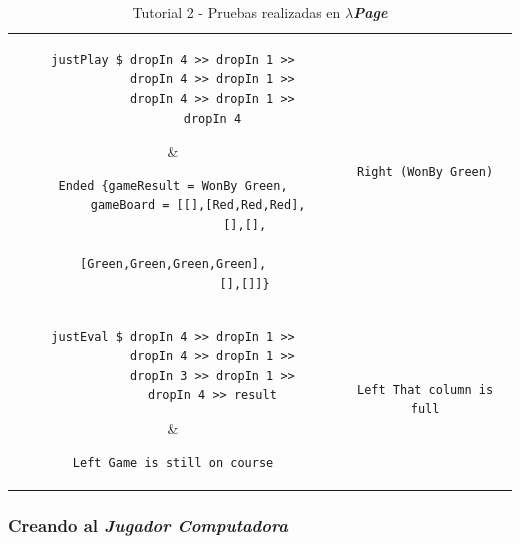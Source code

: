 \documentclass[a4paper]{article}
\newcommand{\hpage}{\textbf{\textsl{$\lambda$Page}}}
\begin{document}
\begin{table}[hp]
\begin{center}
\begin{tabular}{@{} cc @{}}
\begin{lstlisting}
justPlay $ dropIn 4 >> dropIn 1 >>
           dropIn 4 >> dropIn 1 >>
           dropIn 4 >> dropIn 1 >>
           dropIn 4
\end{lstlisting} &
\begin{lstlisting}
Ended {gameResult = WonBy Green,
       gameBoard = [[],[Red,Red,Red],
                    [],[],
                    [Green,Green,Green,Green],
                    [],[]]}
\end{lstlisting} \\[1.5em]

\begin{lstlisting}
justEval $ dropIn 4 >> dropIn 1 >>
           dropIn 4 >> dropIn 1 >>
           dropIn 4 >> dropIn 1 >>
           dropIn 4 >> result
\end{lstlisting} &
\begin{lstlisting}
Right (WonBy Green)
\end{lstlisting} \\[1.5em]

\begin{lstlisting}
justEval $ dropIn 4 >> dropIn 1 >>
           dropIn 4 >> dropIn 1 >>
           dropIn 3 >> dropIn 1 >>
           dropIn 4 >> result
\end{lstlisting} &
\begin{lstlisting}
Left Game is still on course
\end{lstlisting} \\[1.5em]

\begin{lstlisting}
justEval $ dropIn 1 >> dropIn 1 >>
           dropIn 1 >> dropIn 1 >>
           dropIn 1 >> dropIn 1 >>
           dropIn 1 >> dropIn 1
\end{lstlisting} &
\begin{lstlisting}
Left That column is full
\end{lstlisting} \\[1.5em]

			\bottomrule
		\end{tabular}
		\caption{Tutorial 2 - Pruebas realizadas en \hpage}
	\end{center}
\end{table}
\lstset{language=haskell, frame=single, tabsize=4}

\newpage
\subsubsection{Creando al \textsl{Jugador Computadora}}
\end{document}
